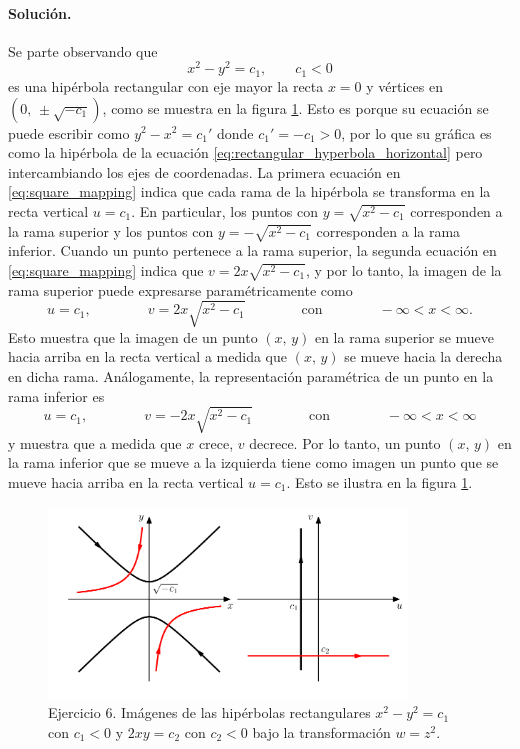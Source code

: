 \documentclass[a4paper]{report}
\begin{document}
\paragraph{Solución.} Se parte observando que
\[
 x^2-y^2=c_1,\qquad c_1<0
\]
es una hipérbola rectangular con eje mayor la recta \(x=0\) y vértices en \((0,\,\pm\sqrt{-c_1})\), como se muestra en la figura \ref{fig:exercise_14_06}. Esto es porque su ecuación se puede escribir como \(y^2-x^2=c_1'\) donde \(c_1'=-c_1>0\), por lo que su gráfica es como la hipérbola de la ecuación \ref{eq:rectangular_hyperbola_horizontal} pero intercambiando los ejes de coordenadas. La primera ecuación en \ref{eq:square_mapping} indica que cada rama de la hipérbola se transforma en la recta vertical \(u=c_1\). En particular, los puntos con \(y=\sqrt{x^2-c_1}\) corresponden a la rama superior y los puntos con \(y=-\sqrt{x^2-c_1}\) corresponden a la rama inferior. Cuando un punto pertenece a la rama superior, la segunda ecuación en \ref{eq:square_mapping} indica que \(v=2x\sqrt{x^2-c_1}\), y por lo tanto, la imagen de la rama superior puede expresarse paramétricamente como
\[
 u=c_1,\qquad\qquad v=2x\sqrt{x^2-c_1}\qquad\qquad\textrm{con}\qquad\qquad-\infty<x<\infty.
\]
Esto muestra que la imagen de un punto \((x,\,y)\) en la rama superior se mueve hacia arriba en la recta vertical a medida que \((x,\,y)\) se mueve hacia la derecha en dicha rama. Análogamente, la representación paramétrica de un punto en la rama inferior es
\[
 u=c_1,\qquad\qquad v=-2x\sqrt{x^2-c_1}\qquad\qquad\textrm{con}\qquad\qquad-\infty<x<\infty
\]
y muestra que a medida que \(x\) crece, \(v\) decrece. Por lo tanto, un punto \((x,\,y)\) en la rama inferior que se mueve a la izquierda tiene como imagen un punto que se mueve hacia arriba en la recta vertical \(u=c_1\). Esto se ilustra en la figura \ref{fig:exercise_14_06}.
\begin{figure}[!htb]
 \begin{center}
 \includegraphics[width=0.85\textwidth]{figuras/exercise_14_06.pdf}
 \caption{\label{fig:exercise_14_06} Ejercicio 6. Imágenes de las hipérbolas rectangulares \(x^2-y^2=c_1\) con \(c_1<0\) y \(2xy=c_2\) con \(c_2<0\) bajo la transformación \(w=z^2\).}
 \end{center}
\end{figure}
\end{document}
